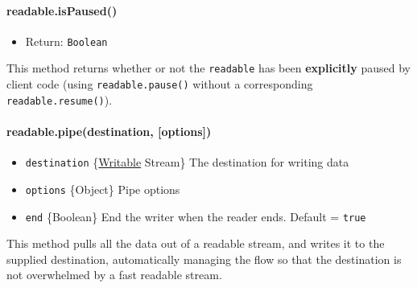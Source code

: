 \paragraph{readable.isPaused()}\label{readable.ispaused}

\begin{itemize}
\itemsep1pt\parskip0pt
\item
  Return: \texttt{Boolean}
\end{itemize}

This method returns whether or not the \texttt{readable} has been
\textbf{explicitly} paused by client code (using
\texttt{readable.pause()} without a corresponding
\texttt{readable.resume()}).

\begin{Shaded}
\begin{Highlighting}[]
  

\NormalTok{() }
\NormalTok{()}
\NormalTok{() }
\NormalTok{()}
\NormalTok{() }
\end{Highlighting}
\end{Shaded}

\paragraph{readable.pipe(destination,
{[}options{]})}\label{readable.pipedestination-options}

\begin{itemize}
\itemsep1pt\parskip0pt
\item
  \texttt{destination}
  \{\hyperref[streamux5fclassux5fstreamux5fwritable]{Writable} Stream\}
  The destination for writing data
\item
  \texttt{options} \{Object\} Pipe options
\item
  \texttt{end} \{Boolean\} End the writer when the reader ends. Default
  = \texttt{true}
\end{itemize}

This method pulls all the data out of a readable stream, and writes it
to the supplied destination, automatically managing the flow so that the
destination is not overwhelmed by a fast readable stream.

